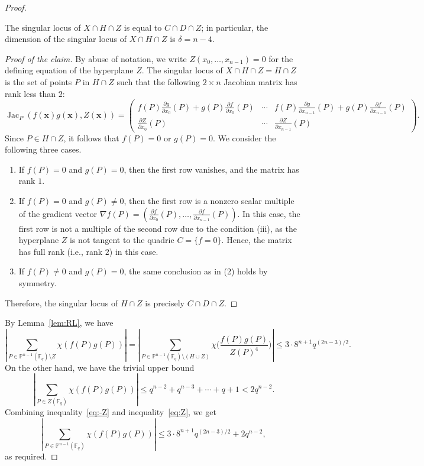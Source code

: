 \documentclass[10pt,a4paper]{amsart}
\newcommand{\F}{\mathbb{F}}
\newenvironment{poc}{\begin{proof}[Proof of the claim]\renewcommand*{\qedsymbol}{$\blacksquare$}}{\end{proof}}
\begin{document}
\begin{proof}
\begin{claim}
The singular locus of $X\cap H\cap Z$ is equal to $C\cap D\cap Z$; in particular, the dimension of the singular locus of $X\cap H\cap Z$ is $\delta = n-4$.
\end{claim}
\begin{poc}
By abuse of notation, we write $Z(x_0, \ldots, x_{n-1})=0$ for the defining equation of the hyperplane $Z$. The singular locus of $X\cap H\cap Z = H\cap Z$ is the set of points $P$ in $H\cap Z$ such that the following $2\times n$ Jacobian matrix has rank less than $2$:
$$
\operatorname{Jac}_{P}(f(\mathbf{x})g(\mathbf{x}), Z(\mathbf{x})) = 
\begin{pmatrix}
 f(P) \frac{\partial g}{\partial x_0}(P) + g(P) \frac{\partial f}{\partial x_0}(P) &  \cdots &  f(P) \frac{\partial g}{\partial x_{n-1}}(P) + g(P) \frac{\partial f}{\partial x_{n-1}}(P) \\ 
 \frac{\partial Z}{\partial x_0}(P) & \cdots & \frac{\partial Z}{\partial x_{n-1}}(P)
\end{pmatrix}.
$$
Since $P\in H\cap Z$, it follows that $f(P)=0$ or $g(P)=0$. We consider the following three cases. 
\begin{enumerate}
    \item If $f(P)=0$ and $g(P)=0$, then the first row vanishes, and the matrix has rank $1$. 
\item If $f(P)=0$ and $g(P)\neq 0$, then the first row is a nonzero scalar multiple of the gradient vector $\nabla f (P)=\left(\frac{\partial f}{\partial x_0}(P), \ldots, \frac{\partial f}{\partial x_{n-1}}(P) \right)$. In this case, the first row is not a multiple of the second row due to the condition (iii), as the hyperplane $Z$ is not tangent to the quadric $C=\{f=0\}$. Hence, the matrix has full rank (i.e., rank $2$) in this case.
\item If $f(P)\neq 0$ and $g(P)=0$, the same conclusion as in (2) holds by symmetry. 
\end{enumerate}
Therefore, the singular locus of $H\cap Z$ is precisely $C\cap D\cap Z$.
\end{poc}

By Lemma~\ref{lem:RL}, we have
\begin{equation}\label{eq:-Z}
\left|\sum_{P\in\mathbb{P}^{n-1}(\F_q)\setminus Z} \chi(f(P) g(P))\right|=\left|\sum_{P\in\mathbb{P}^{n-1}(\F_q)\setminus (H \cup Z)} \chi\bigg(\frac{f(P) g(P)}{Z(P)^4}\bigg)\right| \leq 3\cdot 8^{n+1} q^{(2n-3)/2}.  
\end{equation}
On the other hand, we have the trivial upper bound 
\begin{equation}\label{eq:Z}
\left|\sum_{P\in Z(\F_q)} \chi(f(P) g(P))\right| \leq q^{n-2}+q^{n-3} + \cdots + q + 1 < 2 q^{n-2}.
\end{equation}
Combining inequality~\eqref{eq:-Z} and inequality~\eqref{eq:Z}, we get
$$
\left|\sum_{P\in\mathbb{P}^{n-1}(\F_q)} \chi(f(P) g(P))\right| \leq 3\cdot 8^{n+1} q^{(2n-3)/2} +2q^{n-2}, 
$$
as required.
\end{proof}
\end{document}

